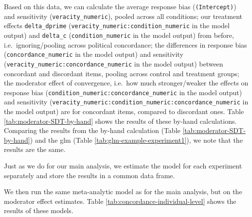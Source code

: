 \documentclass[
  man,mask,floatsintext]{apa6}
\begin{document}
Based on this data, we can calculate the average response bias (\texttt{(Intercept)}) and sensitivity (\texttt{veracity\_numeric}), pooled across all conditions; our treatment effects \texttt{delta\_dprime} (\texttt{veracity\_numeric:condition\_numeric} in the model output) and \texttt{delta\_c} (\texttt{condition\_numeric} in the model output) from before, i.e.~ignoring/pooling across political concordance; the differences in response bias (\texttt{concordance\_numeric} in the model output) and sensitivity (\texttt{veracity\_numeric:concordance\_numeric} in the model output) between concordant and discordant items, pooling across control and treatment groups; the moderator effect of convergence, i.e.~how much stronger/weaker the effects on response bias (\texttt{condition\_numeric:concordance\_numeric} in the model output) and sensitivity (\texttt{veracity\_numeric:condition\_numeric:concordance\_numeric} in the model output) are for concordant items, compared to discordant ones. Table \ref{tab:moderator-SDT-by-hand} shows the results of these by-hand calculations. Comparing the results from the by-hand calculation (Table \ref{tab:moderator-SDT-by-hand}) and the glm (Table \ref{tab:glm-example-experiment1}), we note that the results are the same.

\begin{table}
\centering
\caption{\label{tab:moderator-SDT-by-hand}Outcomes from by-hand SDT calculation.}
\centering
{}
\end{table}

Just as we do for our main analysis, we estimate the model for each experiment separately and store the results in a common data frame.

We then run the same meta-analytic model as for the main analysis, but on the moderator effect estimates. Table \ref{tab:concordance-individual-level} shows the results of these models.
\end{document}
